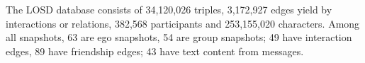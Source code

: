 The LOSD database consists of 34,120,026 triples, 3,172,927 edges yield by interactions or relations, 382,568 participants and 253,155,020 characters. Among all snapshots, 63 are ego snapshots, 54 are group snapshots; 49 have interaction edges, 89 have friendship edges; 43 have text content from messages.